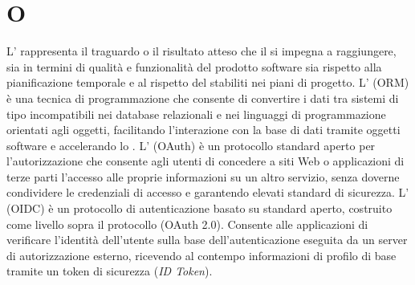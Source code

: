 \section{O}
L' rappresenta il traguardo o il risultato atteso che il  si impegna a raggiungere, sia in termini di qualità e funzionalità del prodotto software sia rispetto alla pianificazione temporale e al rispetto del  stabiliti nei piani di progetto.
L' (ORM) è una tecnica di programmazione che consente di convertire i dati tra sistemi di tipo incompatibili nei database relazionali e nei linguaggi di programmazione orientati agli oggetti, facilitando l'interazione con la base di dati tramite oggetti software e accelerando lo .
L' (OAuth) è un protocollo standard aperto per l'autorizzazione che consente agli utenti di concedere a siti Web o applicazioni di terze parti l'accesso alle proprie informazioni su un altro servizio, senza doverne condividere le credenziali di accesso e garantendo elevati standard di sicurezza.
L' (OIDC) è un protocollo di autenticazione basato su standard aperto, costruito come livello sopra il protocollo  (OAuth 2.0). Consente alle applicazioni di verificare l'identità dell'utente sulla base dell'autenticazione eseguita da un server di autorizzazione esterno, ricevendo al contempo informazioni di profilo di base tramite un token di sicurezza (\emph{ID Token}).
